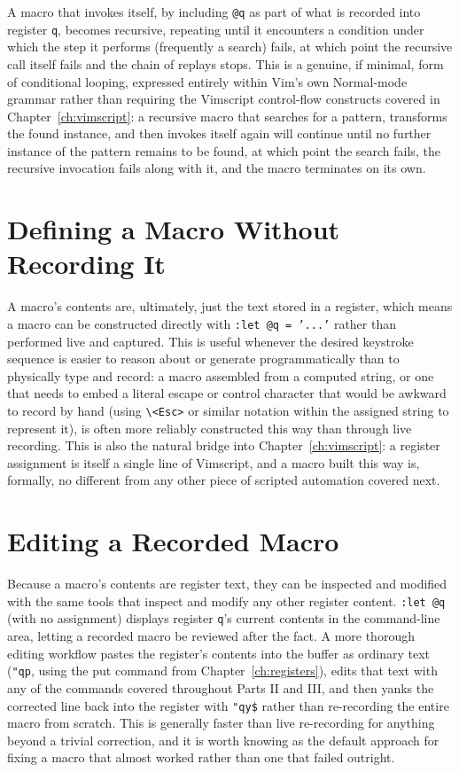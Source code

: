 A macro that invokes itself, by including \texttt{@q} as part of what is recorded into register \texttt{q}, becomes recursive, repeating until it encounters a condition under which the step it performs (frequently a search) fails, at which point the recursive call itself fails and the chain of replays stops. This is a genuine, if minimal, form of conditional looping, expressed entirely within Vim's own Normal-mode grammar rather than requiring the Vimscript control-flow constructs covered in Chapter~\ref{ch:vimscript}: a recursive macro that searches for a pattern, transforms the found instance, and then invokes itself again will continue until no further instance of the pattern remains to be found, at which point the search fails, the recursive invocation fails along with it, and the macro terminates on its own.

\section{Defining a Macro Without Recording It}

A macro's contents are, ultimately, just the text stored in a register, which means a macro can be constructed directly with \texttt{:let @q = '...'} rather than performed live and captured. This is useful whenever the desired keystroke sequence is easier to reason about or generate programmatically than to physically type and record: a macro assembled from a computed string, or one that needs to embed a literal escape or control character that would be awkward to record by hand (using \texttt{\textbackslash{}<Esc>} or similar notation within the assigned string to represent it), is often more reliably constructed this way than through live recording. This is also the natural bridge into Chapter~\ref{ch:vimscript}: a register assignment is itself a single line of Vimscript, and a macro built this way is, formally, no different from any other piece of scripted automation covered next.

\section{Editing a Recorded Macro}

Because a macro's contents are register text, they can be inspected and modified with the same tools that inspect and modify any other register content. \texttt{:let @q} (with no assignment) displays register \texttt{q}'s current contents in the command-line area, letting a recorded macro be reviewed after the fact. A more thorough editing workflow pastes the register's contents into the buffer as ordinary text (\texttt{"qp}, using the put command from Chapter~\ref{ch:registers}), edits that text with any of the commands covered throughout Parts II and III, and then yanks the corrected line back into the register with \texttt{"qy\$} rather than re-recording the entire macro from scratch. This is generally faster than live re-recording for anything beyond a trivial correction, and it is worth knowing as the default approach for fixing a macro that almost worked rather than one that failed outright.


